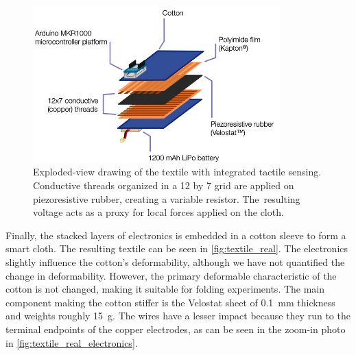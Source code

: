 \documentclass[\home/main.tex]{subfiles}
\begin{document}
\begin{figure}[htpb]
    \centering
    \includegraphics[width=0.85\textwidth, keepaspectratio]{figures/textile_overview.jpg}
    \caption[Exploded-view drawing of the textile with integrated tactile sensing.]{Exploded-view drawing of the textile with integrated tactile sensing. Conductive threads organized in a 12 by 7 grid are applied on piezoresistive rubber, creating a variable resistor. The~resulting voltage acts as a proxy for local forces applied on the cloth. }
    \label{fig:textile_scheme}
\end{figure}

Finally, the stacked layers of electronics is embedded in a cotton sleeve to form a smart cloth. The resulting textile can be seen in \cref{fig:textile_real}. The electronics slightly influence the cotton's deformability, although we have not quantified the change in deformability. However, the primary deformable characteristic of the cotton is not changed, making it suitable for folding experiments. The main component making the cotton stiffer is the Velostat sheet of \qty{0.1}{\milli\meter} thickness and weights roughly \qty{15}{\gram}. The wires have a lesser impact because they run to the terminal endpoints of the copper electrodes, as can be seen in the zoom-in photo in \cref{fig:textile_real_electronics}.
\end{document}
